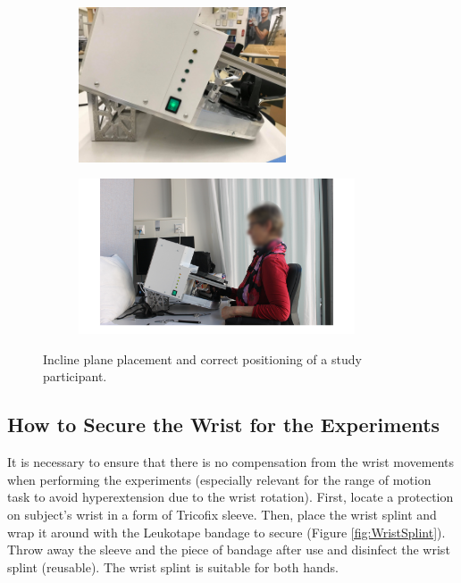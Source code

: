 \documentclass[10pt,oneside,a4paper]{article}
\begin{document}
\begin{figure}[h!]
\centering
\begin{subfigure}[b]{0.4\textwidth}
	\includegraphics[height=4.6cm]{images/Hardware/Incline.jpg}
\end{subfigure}
\hfill
\begin{subfigure}[b]{0.58\textwidth}
	\includegraphics[height=4.6cm]{images/Subjects/SubjectsPosition.png}
\end{subfigure}
\caption{Incline plane placement and correct positioning of a study participant.}
\label{fig:incline}
\end{figure}

\subsection{How to Secure the Wrist for the Experiments}
It is necessary to ensure that there is no compensation from the wrist movements when performing the experiments (especially relevant for the range of motion task to avoid hyperextension due to the wrist rotation). First, locate a protection on subject’s wrist in a form of Tricofix sleeve. Then, place the wrist splint and wrap it around with the Leukotape bandage to secure (Figure \ref{fig:WristSplint}). Throw away the sleeve and the piece of bandage after use and disinfect the wrist splint (reusable). The wrist splint is suitable for both hands. 
\end{document}
